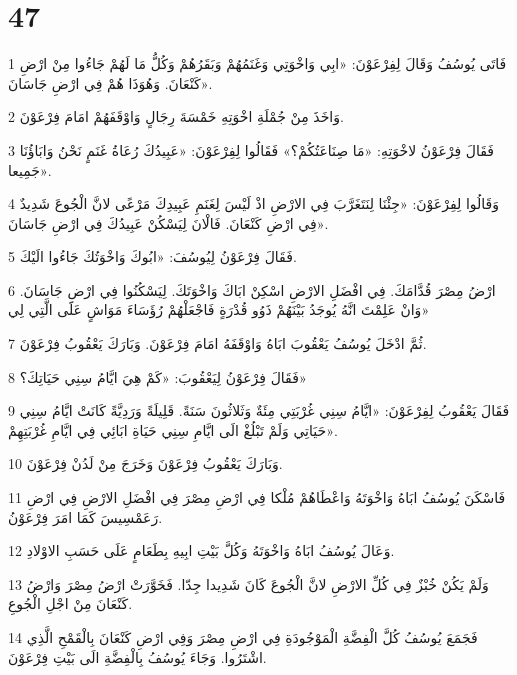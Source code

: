 \chapter{47}

\par 1 فَاتَى يُوسُفُ وَقَالَ لِفِرْعَوْنَ: «ابِي وَاخْوَتِي وَغَنَمُهُمْ وَبَقَرُهُمْ وَكُلُّ مَا لَهُمْ جَاءُوا مِنْ ارْضِ كَنْعَانَ. وَهُوَذَا هُمْ فِي ارْضِ جَاسَانَ».
\par 2 وَاخَذَ مِنْ جُمْلَةِ اخْوَتِهِ خَمْسَةَ رِجَالٍ وَاوْقَفَهُمْ امَامَ فِرْعَوْنَ.
\par 3 فَقَالَ فِرْعَوْنُ لاخْوَتِهِ: «مَا صِنَاعَتُكُمْ؟» فَقَالُوا لِفِرْعَوْنَ: «عَبِيدُكَ رُعَاةُ غَنَمٍ نَحْنُ وَابَاؤُنَا جَمِيعا».
\par 4 وَقَالُوا لِفِرْعَوْنَ: «جِئْنَا لِنَتَغَرَّبَ فِي الارْضِ اذْ لَيْسَ لِغَنَمِ عَبِيدِكَ مَرْعًى لانَّ الْجُوعَ شَدِيدٌ فِي ارْضِ كَنْعَانَ. فَالْانَ لِيَسْكُنْ عَبِيدُكَ فِي ارْضِ جَاسَانَ».
\par 5 فَقَالَ فِرْعَوْنُ لِيُوسُفَ: «ابُوكَ وَاخْوَتُكَ جَاءُوا الَيْكَ.
\par 6 ارْضُ مِصْرَ قُدَّامَكَ. فِي افْضَلِ الارْضِ اسْكِنْ ابَاكَ وَاخْوَتَكَ. لِيَسْكُنُوا فِي ارْضِ جَاسَانَ. وَانْ عَلِمْتَ انَّهُ يُوجَدُ بَيْنَهُمْ ذَوُو قُدْرَةٍ فَاجْعَلْهُمْ رُؤَسَاءَ مَوَاشٍ عَلَى الَّتِي لِي»
\par 7 ثُمَّ ادْخَلَ يُوسُفُ يَعْقُوبَ ابَاهُ وَاوْقَفَهُ امَامَ فِرْعَوْنَ. وَبَارَكَ يَعْقُوبُ فِرْعَوْنَ.
\par 8 فَقَالَ فِرْعَوْنُ لِيَعْقُوبَ: «كَمْ هِيَ ايَّامُ سِنِي حَيَاتِكَ؟»
\par 9 فَقَالَ يَعْقُوبُ لِفِرْعَوْنَ: «ايَّامُ سِنِي غُرْبَتِي مِئَةٌ وَثَلاثُونَ سَنَةً. قَلِيلَةً وَرَدِيَّةً كَانَتْ ايَّامُ سِنِي حَيَاتِي وَلَمْ تَبْلُغْ الَى ايَّامِ سِنِي حَيَاةِ ابَائِي فِي ايَّامِ غُرْبَتِهِمْ».
\par 10 وَبَارَكَ يَعْقُوبُ فِرْعَوْنَ وَخَرَجَ مِنْ لَدُنْ فِرْعَوْنَ.
\par 11 فَاسْكَنَ يُوسُفُ ابَاهُ وَاخْوَتَهُ وَاعْطَاهُمْ مُلْكا فِي ارْضِ مِصْرَ فِي افْضَلِ الارْضِ فِي ارْضِ رَعَمْسِيسَ كَمَا امَرَ فِرْعَوْنُ.
\par 12 وَعَالَ يُوسُفُ ابَاهُ وَاخْوَتَهُ وَكُلَّ بَيْتِ ابِيهِ بِطَعَامٍ عَلَى حَسَبِ الاوْلادِ.
\par 13 وَلَمْ يَكُنْ خُبْزٌ فِي كُلِّ الارْضِ لانَّ الْجُوعَ كَانَ شَدِيدا جِدّا. فَخَوَّرَتْ ارْضُ مِصْرَ وَارْضُ كَنْعَانَ مِنْ اجْلِ الْجُوعِ.
\par 14 فَجَمَعَ يُوسُفُ كُلَّ الْفِضَّةِ الْمَوْجُودَةِ فِي ارْضِ مِصْرَ وَفِي ارْضِ كَنْعَانَ بِالْقَمْحِ الَّذِي اشْتَرُوا. وَجَاءَ يُوسُفُ بِالْفِضَّةِ الَى بَيْتِ فِرْعَوْنَ.
